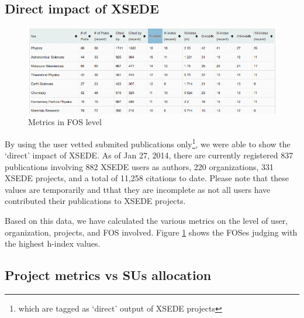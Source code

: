 \documentclass{sig-alternate}
\begin{document}
\subsection{Direct impact of XSEDE} 
 
\begin{figure}[htb] 
  \centering 
    \includegraphics[width=1.0\columnwidth]{images/XDPUBS_Metrics_FOS.png} 
  \caption{Metrics in FOS level}\label{F:xdpubs-metrics-fos} 
\end{figure} 
 
By using the user vetted submited publications only\footnote{which are tagged as `direct' output of XSEDE projects}, we were able to show the `direct' impact of XSEDE.  As of Jan 27, 2014, there are currently registered 837 publications involving 882 XSEDE users as authors, 220 organizations, 331 XSEDE projects, and a total of 11,258 citations to date. Please note that these values are temporarily and tthat they are incomplete as not all users have contributed their publications to XSEDE projects.

Based on this data,  we have calculated the various metrics on the level of user, organization, projects, and FOS involved. Figure \ref{F:xdpubs-metrics-fos} shows the FOSes judging with the highest h-index values. 
 
\subsection{Project metrics vs SUs allocation} 
 
\end{document}
